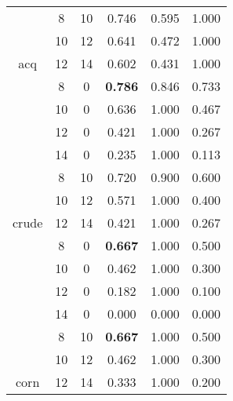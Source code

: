 \begin{table}[]
\begin{tabular}{|c|
>{\columncolor[HTML]{EFEFEF}}c |
>{\columncolor[HTML]{EFEFEF}}c |c|c|c|}
                        & 8                                   & 10                                  & 0.746          & 0.595     & 1.000  \\
                        & 10                                  & 12                                  & 0.641          & 0.472     & 1.000  \\
\multirow{-7}{*}{acq}   & 12                                  & 14                                  & 0.602          & 0.431     & 1.000  \\ \hline
                        & 8                                   & 0                                   & \textbf{0.786} & 0.846     & 0.733  \\
                        & 10                                  & 0                                   & 0.636          & 1.000     & 0.467  \\
                        & 12                                  & 0                                   & 0.421          & 1.000     & 0.267  \\
                        & 14                                  & 0                                   & 0.235          & 1.000     & 0.113  \\
                        & 8                                   & 10                                  & 0.720          & 0.900     & 0.600  \\
                        & 10                                  & 12                                  & 0.571          & 1.000     & 0.400  \\
\multirow{-7}{*}{crude} & 12                                  & 14                                  & 0.421          & 1.000     & 0.267  \\ \hline
                        & 8                                   & 0                                   & \textbf{0.667} & 1.000     & 0.500  \\
                        & 10                                  & 0                                   & 0.462          & 1.000     & 0.300  \\
                        & 12                                  & 0                                   & 0.182          & 1.000     & 0.100  \\
                        & 14                                  & 0                                   & 0.000          & 0.000     & 0.000  \\
                        & 8                                   & 10                                  & \textbf{0.667} & 1.000     & 0.500  \\
                        & 10                                  & 12                                  & 0.462          & 1.000     & 0.300  \\
\multirow{-7}{*}{corn}  & 12                                  & 14                                  & 0.333          & 1.000     & 0.200  \\ \hline
\end{tabular}
\end{table}
